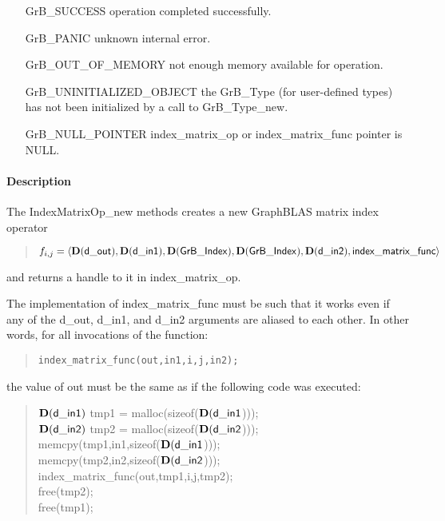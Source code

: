\begin{itemize}[leftmargin=2.1in]
\item[{\sf GrB\_SUCCESS}]           operation completed successfully.
\item[{\sf GrB\_PANIC}]             unknown internal error.
\item[{\sf GrB\_OUT\_OF\_MEMORY}]          not enough memory available for operation.
\item[{\sf GrB\_UNINITIALIZED\_OBJECT}]          the {\sf GrB\_Type} (for user-defined types)
                                    has not been initialized by a call to {\sf GrB\_Type\_new}.
\item[{\sf GrB\_NULL\_POINTER}]    {\sf index\_matrix\_op} or {\sf index\_matrix\_func} pointer is {\sf NULL}.

\end{itemize}

\paragraph{Description}

The {\sf IndexMatrixOp\_new} methods creates a new GraphBLAS matrix index operator
\begin{quote}
$f_{i,j} = \langle \mathbf{D}({\sf d\_out}), \mathbf{D}({\sf d\_in1}), \mathbf{D}({\sf GrB\_Index}), \mathbf{D}({\sf GrB\_Index}), \mathbf{D}({\sf d\_in2}), {\sf index\_matrix\_func} \rangle$
\end{quote}
and returns a handle to it in {\sf index\_matrix\_op}.

The implementation of {\sf index\_matrix\_func} must be such that it works
even if any of the {\sf d\_out}, {\sf d\_in1}, and {\sf d\_in2} arguments are aliased to each other.
In other words, for all invocations of the function:
\begin{quote}
\begin{verbatim}
index_matrix_func(out,in1,i,j,in2);
\end{verbatim}
\end{quote}
the value of {\sf out} must be the same as if the following code
was executed:

\begin{quote}
\begin{code}
    $\mathbf{D}({\sf d\_in1})$ tmp1 = malloc(sizeof($\mathbf{D}({\sf d\_in1}$))); \\
    $\mathbf{D}({\sf d\_in2})$ tmp2 = malloc(sizeof($\mathbf{D}({\sf d\_in2}$))); \\
    memcpy(tmp1,in1,sizeof($\mathbf{D}({\sf d\_in1}$))); \\
    memcpy(tmp2,in2,sizeof($\mathbf{D}({\sf d\_in2}$))); \\
    index\_matrix\_func(out,tmp1,i,j,tmp2); \\
    free(tmp2); \\
    free(tmp1);
\end{code}
\end{quote}

